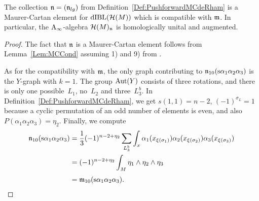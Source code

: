 \documentclass[\MainFolder/Text.tex]{subfiles}
\begin{document}
\begin{Proposition}\label{Prop:FormalPushforwardProp}
The collection $\mathfrak{n} = (\mathfrak{n}_{lg})$ from Definition~\ref{Def:PushforwardMCdeRham} is a Maurer-Cartan element for $\mathrm{dIBL}(\mathcal{H}(M))$ which is compatible with $\mathfrak{m}$. In particular, the $\mathrm{A}_\infty$-algebra $\mathcal{H}(M)_{\mathfrak{n}}$ is homologically unital and augmented.
\end{Proposition}
\begin{proof}
The fact that $\mathfrak{n}$ is a Maurer-Cartan element follows from Lemma~\ref{Lem:MCCond} assuming 1) and 9) from \cite{Cieliebak2018}. 

As for the compatibility with $\mathfrak{m}$,
the only graph contributing to $\mathfrak{n}_{10}(\mathrm{s} \alpha_1 \alpha_2 \alpha_3)$  is the $Y$-graph with $k=1$. The group $\operatorname{Aut}(Y)$ consists of three rotations, and there is only one possible~$L_1$, no~$L_2$ and three~$L_3^b$. In Definition~\ref{Def:PushforwardMCdeRham}, we get $s(1,1) = n-2$, $(-1)^{\sigma_L} = 1$ because a cyclic permutation of an odd number of elements is even, and also $P(\alpha_1\alpha_2\alpha_3) =\eta_2$. Finally, we compute
\begin{align*}%
 \PMC_{10}(\Susp \alpha_1 \alpha_2 \alpha_3) &= \frac{1}{3} (-1)^{n-2 + \eta_2}\sum_{L_3^b} \int_x \alpha_1(x_{\xi(\sigma_1)})\alpha_2(x_{\xi(\sigma_2)})\alpha_3(x_{\xi(\sigma_3)}) \\ 
 & = (-1)^{n-2 + \eta_2}\int_M \eta_1 \wedge \eta_2 \wedge \eta_3\\[\jot]
 & = \MC_{10}(\Susp \alpha_1 \alpha_2 \alpha_3).\qedhere
\end{align*}
\end{proof}
%
\end{document}
